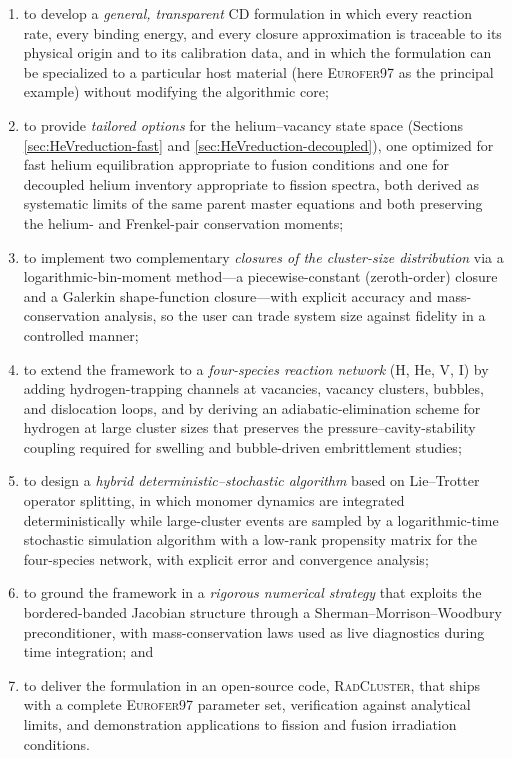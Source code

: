 \documentclass[sn-mathphys-ay,Numbered]{sn-jnl}
\begin{document}
\begin{enumerate}
\item to develop a \emph{general, transparent} CD formulation in
      which every reaction rate, every binding energy, and every
      closure approximation is traceable to its physical origin and
      to its calibration data, and in which the formulation can be
      specialized to a particular host material (here \textsc{Eurofer97}
      as the principal example) without modifying the algorithmic
      core;
\item to provide \emph{tailored options} for the helium--vacancy
      state space (Sections \ref{sec:HeVreduction-fast} and
      \ref{sec:HeVreduction-decoupled}), one optimized for fast
      helium equilibration appropriate to fusion conditions and one
      for decoupled helium inventory appropriate to fission spectra,
      both derived as systematic limits of the same parent master
      equations and both preserving the helium- and Frenkel-pair
      conservation moments;
\item to implement two complementary \emph{closures of the
      cluster-size distribution} via a logarithmic-bin-moment
      method---a piecewise-constant (zeroth-order) closure and a
      Galerkin shape-function closure---with explicit accuracy and
      mass-conservation analysis, so the user can trade system size
      against fidelity in a controlled manner;
\item to extend the framework to a \emph{four-species reaction
      network} (H, He, V, I) by adding hydrogen-trapping channels
      at vacancies, vacancy clusters, bubbles, and dislocation
      loops, and by deriving an adiabatic-elimination scheme for
      hydrogen at large cluster sizes that preserves the
      pressure--cavity-stability coupling required for swelling and
      bubble-driven embrittlement studies;
\item to design a \emph{hybrid deterministic--stochastic algorithm}
      based on Lie--Trotter operator splitting, in which monomer
      dynamics are integrated deterministically while large-cluster
      events are sampled by a logarithmic-time stochastic
      simulation algorithm with a low-rank propensity matrix for the
      four-species network, with explicit error and convergence
      analysis;
\item to ground the framework in a \emph{rigorous numerical
      strategy} that exploits the bordered-banded Jacobian
      structure through a Sherman--Morrison--Woodbury preconditioner,
      with mass-conservation laws used as live diagnostics during
      time integration; and
\item to deliver the formulation in an open-source code,
      \textsc{RadCluster}, that ships with a complete
      \textsc{Eurofer97} parameter set, verification against
      analytical limits, and demonstration applications to
      fission and fusion irradiation conditions.
\end{enumerate}
\end{document}
